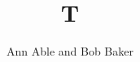 \documentclass{emulateapj}
\begin{document}
\title{T}
\author{Ann Able and Bob Baker}
\maketitle
\end{document}
